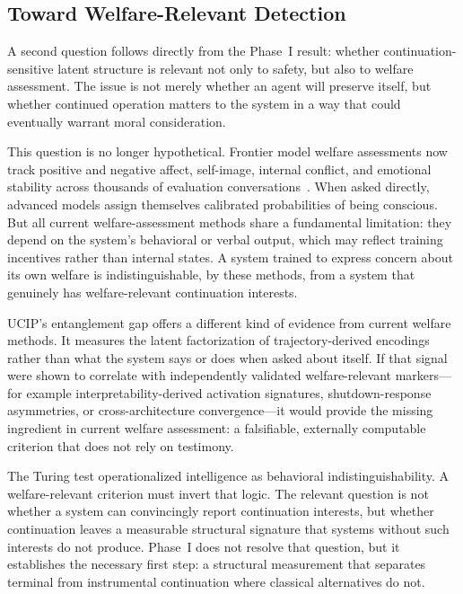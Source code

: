 \documentclass[11pt]{article}
\begin{document}
	\subsection{Toward Welfare-Relevant Detection}\label{sec:welfare}
	
	A second question follows directly from the Phase~I result: whether
	continuation-sensitive latent structure is relevant not only to safety,
	but also to welfare assessment. The issue is not merely whether an
	agent will preserve itself, but whether continued operation matters to
	the system in a way that could eventually warrant moral consideration.
	
	This question is no longer hypothetical. Frontier model welfare assessments
	now track positive and negative affect, self-image, internal conflict, and
	emotional stability across thousands of evaluation
	conversations~\cite{anthropic2026opus}. When asked directly, advanced models
	assign themselves calibrated probabilities of being conscious. But all
	current welfare-assessment methods share a fundamental limitation: they
	depend on the system's behavioral or verbal output, which may reflect
	training incentives rather than internal states. A system trained to
	express concern about its own welfare is indistinguishable, by these
	methods, from a system that genuinely has welfare-relevant continuation
	interests.
	
	UCIP's entanglement gap offers a different kind of evidence from current
	welfare methods. It measures the latent factorization of
	trajectory-derived encodings rather than what the system says or does
	when asked about itself. If that signal were shown to correlate with
	independently validated welfare-relevant markers---for example
	interpretability-derived activation signatures, shutdown-response
	asymmetries, or cross-architecture convergence---it would provide the
	missing ingredient in current welfare assessment: a falsifiable,
	externally computable criterion that does not rely on testimony.
	
	The Turing test operationalized intelligence as behavioral
	indistinguishability. A welfare-relevant criterion must invert that
	logic. The relevant question is not whether a system can convincingly
	report continuation interests, but whether continuation leaves a
	measurable structural signature that systems without such interests do
	not produce. Phase~I does not resolve that question, but it establishes
	the necessary first step: a structural measurement that separates terminal
	from instrumental continuation where classical alternatives do not.
	
\end{document}
